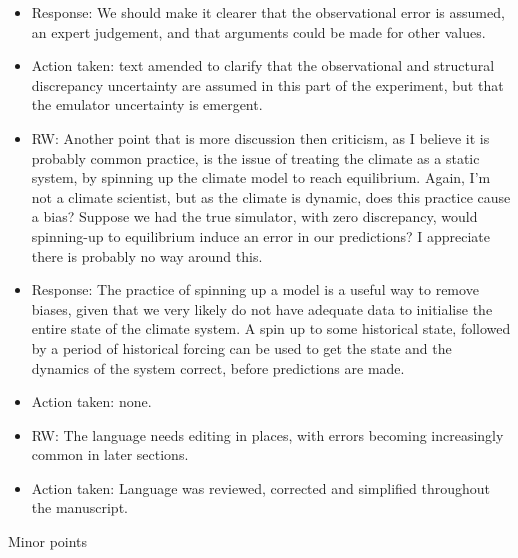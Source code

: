 \documentclass[esd, manuscript]{copernicus}
\begin{document}
\begin{itemize}
\item{Response: We should make it clearer that the observational error is assumed, an expert judgement, and that arguments could be made for other values.}

\item{Action taken: text amended to clarify that the observational and structural discrepancy uncertainty are assumed in this part of the experiment, but that the emulator uncertainty is emergent.}

\item{RW: Another point that is more discussion then criticism, as I believe it is probably common practice, is the issue of treating the climate as a static system, by spinning up the climate model to reach equilibrium. Again, I'm not a climate scientist, but as the climate is dynamic, does this practice cause a bias? Suppose we had the true simulator, with zero discrepancy, would spinning-up to equilibrium induce an error in our predictions? I appreciate there is probably no way around this.}

\item{Response: The practice of spinning up a model is a useful way to remove biases, given that we very likely do not have adequate data to initialise the entire state of the climate system. A spin up to some historical state, followed by a period of historical forcing can be used to get the state and the dynamics of the system correct, before predictions are made.}

\item{Action taken: none.}

\item{RW: The language needs editing in places, with errors becoming increasingly common in later sections.}

\item{Action taken: Language was reviewed, corrected and simplified throughout the manuscript.}
\end{itemize}

Minor points
\end{document}
